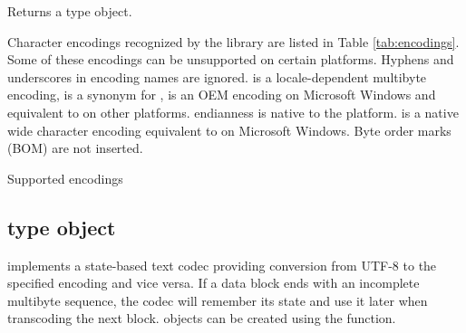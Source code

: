\documentclass[a4paper,12pt,twoside,extrafontsizes]{memoir}
\begin{document}
\begin{funcret}
	Returns a  type object.
\end{funcret}

\begin{funcremarks}
	Character encodings recognized by the library are listed in Table \ref{tab:encodings}. Some of these encodings can be unsupported on certain platforms. Hyphens and underscores in encoding names are ignored.  is a locale-dependent multibyte encoding,  is a synonym for ,  is an OEM encoding on Microsoft Windows and equivalent to  on other platforms.  endianness is native to the platform.  is a native wide character encoding equivalent to  on Microsoft Windows. Byte order marks (BOM) are not inserted.
	
	\begin{table}[htbp]
	\caption{Supported encodings}
	\label{tab:encodings}
	\end{table}
\end{funcremarks}

\subsection{ type object}
\label{subsec:codecfsm}

\begin{funcdescr}
	 implements a state-based text codec providing conversion from UTF-8 to the specified encoding and vice versa. If a data block ends with an incomplete multibyte sequence, the codec will remember its state and use it later when transcoding the next block.  objects can be created using the  function.
\end{funcdescr}
\end{document}
